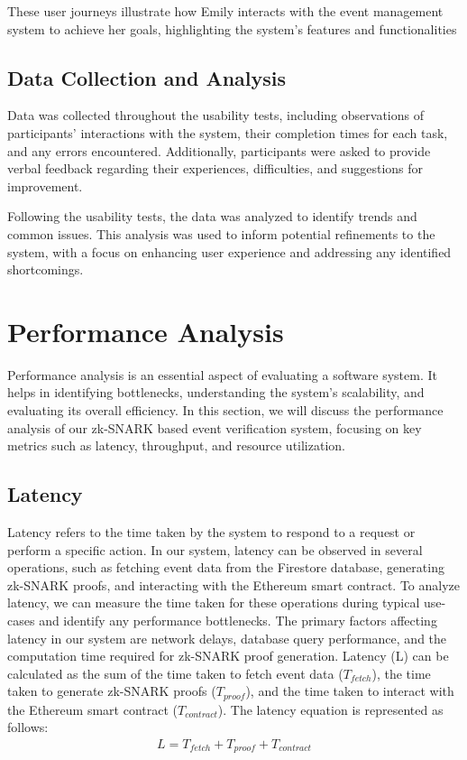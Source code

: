 These user journeys illustrate how Emily interacts with the event management system to achieve her goals, highlighting the system's features and functionalities

\subsection{Data Collection and Analysis}
Data was collected throughout the usability tests, including observations of participants' interactions with the system, their completion times for each task, and any errors encountered. Additionally, participants were asked to provide verbal feedback regarding their experiences, difficulties, and suggestions for improvement.

Following the usability tests, the data was analyzed to identify trends and common issues. This analysis was used to inform potential refinements to the system, with a focus on enhancing user experience and addressing any identified shortcomings.

\section{Performance Analysis}
Performance analysis is an essential aspect of evaluating a software system. It helps in identifying bottlenecks, understanding the system's scalability, and evaluating its overall efficiency. In this section, we will discuss the performance analysis of our zk-SNARK based event verification system, focusing on key metrics such as latency, throughput, and resource utilization.

\subsection{Latency}
Latency refers to the time taken by the system to respond to a request or perform a specific action. In our system, latency can be observed in several operations, such as fetching event data from the Firestore database, generating zk-SNARK proofs, and interacting with the Ethereum smart contract.
To analyze latency, we can measure the time taken for these operations during typical use-cases and identify any performance bottlenecks. The primary factors affecting latency in our system are network delays, database query performance, and the computation time required for zk-SNARK proof generation.
Latency (L) can be calculated as the sum of the time taken to fetch event data ($T_{fetch}$), the time taken to generate zk-SNARK proofs ($T_{proof}$), and the time taken to interact with the Ethereum smart contract ($T_{contract}$). The latency equation is represented as follows:
\begin{align}
L = T_{fetch} + T_{proof} + T_{contract}\label{EqLatency}
\end{align}


